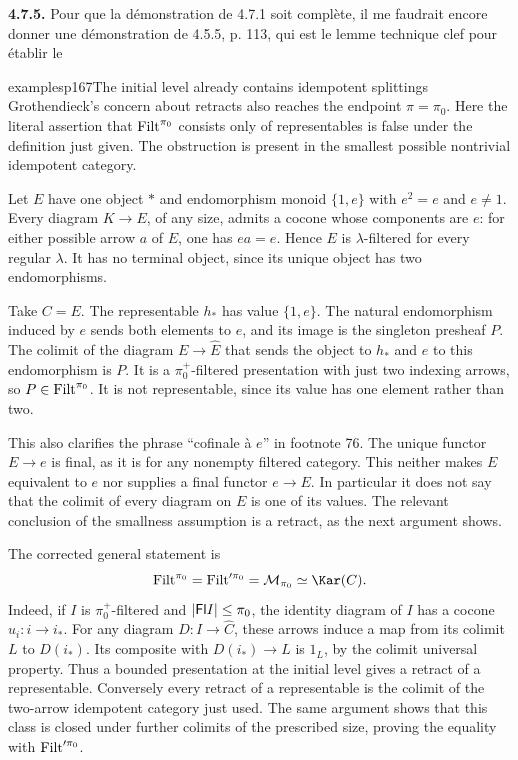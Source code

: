 
\textbf{4.7.5.} Pour que la démonstration de 4.7.1 soit complète, il me faudrait encore donner une démonstration de 4.5.5, p. 113, qui est le lemme technique clef pour établir le

\begin{dcomment}{examples}{p167}{The initial level already contains idempotent splittings}
Grothendieck's concern about retracts also reaches the endpoint $\pi=\pi_0$. Here the literal assertion that $\mathrm{Filt}^{\pi_0}$ consists only of representables is false under the definition just given. The obstruction is present in the smallest possible nontrivial idempotent category.

Let $E$ have one object $*$ and endomorphism monoid $\{1,e\}$ with $e^2=e$ and $e\neq1$. Every diagram $K\to E$, of any size, admits a cocone whose components are $e$: for either possible arrow $a$ of $E$, one has $ea=e$. Hence $E$ is $\lambda$-filtered for every regular $\lambda$. It has no terminal object, since its unique object has two endomorphisms.

Take $C=E$. The representable $h_*$ has value $\{1,e\}$. The natural endomorphism induced by $e$ sends both elements to $e$, and its image is the singleton presheaf $P$. The colimit of the diagram $E\to\widehat E$ that sends the object to $h_*$ and $e$ to this endomorphism is $P$. It is a $\pi_0^+$-filtered presentation with just two indexing arrows, so $P\in\mathrm{Filt}^{\pi_0}$. It is not representable, since its value has one element rather than two.

This also clarifies the phrase ``cofinale \`a $e$'' in footnote 76. The unique functor $E\to e$ is final, as it is for any nonempty filtered category. This neither makes $E$ equivalent to $e$ nor supplies a final functor $e\to E$. In particular it does not say that the colimit of every diagram on $E$ is one of its values. The relevant conclusion of the smallness assumption is a retract, as the next argument shows.

The corrected general statement is
\[
 \Filt^{\pi_0}=\Filt'^{\pi_0}
 =\mathcal M_{\pi_0}\simeq\Kar(C).
\]
Indeed, if $I$ is $\pi_0^+$-filtered and $|\mathsf{Fl} I|\leq\pi_0$, the identity diagram of $I$ has a cocone $u_i:i\to i_*$. For any diagram $D:I\to\widehat C$, these arrows induce a map from its colimit $L$ to $D(i_*)$. Its composite with $D(i_*)\to L$ is $1_L$, by the colimit universal property. Thus a bounded presentation at the initial level gives a retract of a representable. Conversely every retract of a representable is the colimit of the two-arrow idempotent category just used. The same argument shows that this class is closed under further colimits of the prescribed size, proving the equality with $\mathrm{Filt}'^{\pi_0}$.


\end{dcomment}
